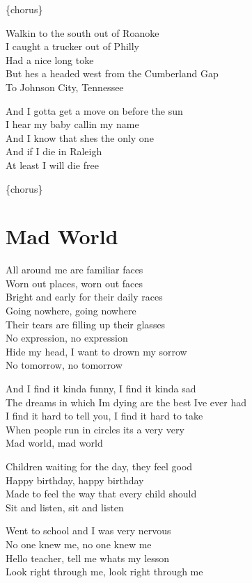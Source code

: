 \documentclass[
  letterpaper,
]{scrbook}
\begin{document}
\{chorus\}

Walkin\textquotesingle{} to the south out of Roanoke\\
I caught a trucker out of Philly\\
Had a nice long toke\\
But he\textquotesingle s a headed west from the Cumberland Gap\\
To Johnson City, Tennessee

And I gotta get a move on before the sun\\
I hear my baby callin\textquotesingle{} my name\\
And I know that she\textquotesingle s the only one\\
And if I die in Raleigh\\
At least I will die free

\{chorus\}

\hypertarget{mad-world}{%
\chapter{Mad World}\label{mad-world}}

All around me are familiar faces\\
Worn out places, worn out faces\\
Bright and early for their daily races\\
Going nowhere, going nowhere\\
Their tears are filling up their glasses\\
No expression, no expression\\
Hide my head, I want to drown my sorrow\\
No tomorrow, no tomorrow

And I find it kinda funny, I find it kinda sad\\
The dreams in which I\textquotesingle m dying are the best
I\textquotesingle ve ever had\\
I find it hard to tell you, I find it hard to take\\
When people run in circles it\textquotesingle s a very very\\
Mad world, mad world

Children waiting for the day, they feel good\\
Happy birthday, happy birthday\\
Made to feel the way that every child should\\
Sit and listen, sit and listen

Went to school and I was very nervous\\
No one knew me, no one knew me\\
Hello teacher, tell me what\textquotesingle s my lesson\\
Look right through me, look right through me
\end{document}
